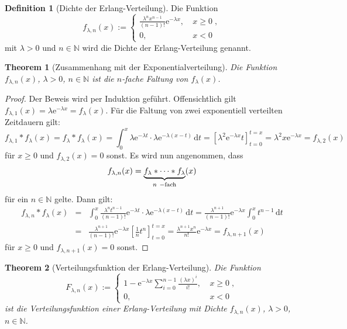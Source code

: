 \documentclass[a4paper,11pt,oneside]{article}
\newtheorem{theorem}{Theorem}
\theoremstyle{definition}
\newtheorem{definition}{Definition}
\begin{document}
\begin{definition}[Dichte der Erlang-Verteilung]
Die Funktion
$$
f_{\lambda,n}(x):=\left\{\begin{matrix}
\frac{\lambda^n x^{n-1}}{(n-1)!} \mathrm{e}^{-\lambda x},&~x\ge0\;,\\
0,&~x<0
\end{matrix}\right.
$$
mit $\lambda>0$ und $n\in\mathbb{N}$ wird die Dichte der Erlang-Verteilung genannt.
\end{definition}

\begin{theorem}[Zusammenhang mit der Exponentialverteilung]
Die Funktion $f_{\lambda,n}(x)$, $\lambda>0$, $n\in\mathbb{N}$ ist die $n$-fache Faltung von $f_\lambda(x)$.
\end{theorem}

\begin{proof}
Der Beweis wird per Induktion geführt. Offensichtlich gilt $f_{\lambda,1}(x)=\lambda \mathrm{e}^{-\lambda x}=f_\lambda(x)$. Für die Faltung von zwei exponentiell verteilten Zeitdauern gilt:
$$
f_{\lambda,1}*f_\lambda(x)=
f_\lambda*f_\lambda(x)=
\int_0^x \lambda \mathrm{e}^{-\lambda t}\cdot\lambda \mathrm{e}^{-\lambda(x-t)}\,\mbox{d}t=
\left[\lambda^2\mathrm{e}^{-\lambda x}t\right]_{t=0}^{t=x}=
\lambda^2x\mathrm{e}^{-\lambda x}=f_{\lambda,2}(x)
$$
für $x\ge0$ und $f_{\lambda,2}(x)=0$ sonst. Es wird nun angenommen, dass
$$
f_{\lambda,n}(x)=\underbrace{f_\lambda*\cdots*f_\lambda}_{n~{\rm-fach}}(x)
$$
für ein $n\in\mathbb{N}$ gelte.
Dann gilt:
\begin{eqnarray*}
f_{\lambda,n}*f_\lambda(x)&=&
\int_0^x \frac{\lambda^n t^{n-1}}{(n-1)!}\mathrm{e}^{-\lambda t}\cdot\lambda \mathrm{e}^{-\lambda(x-t)}\,\mbox{d}t=
\frac{\lambda^{n+1}}{(n-1)!}\mathrm{e}^{-\lambda x}\int_0^x t^{n-1}\,\mbox{d}t\\&=&
\frac{\lambda^{n+1}}{(n-1)!}\mathrm{e}^{-\lambda x}\left[\frac{1}{n}t^n\right]_{t=0}^{t=x}=
\frac{\lambda^{n+1}x^n}{n!}\mathrm{e}^{-\lambda x}=
f_{\lambda,n+1}(x)
\end{eqnarray*}
für $x\ge0$ und $f_{\lambda,n+1}(x)=0$ sonst.
\end{proof}

\begin{theorem}[Verteilungsfunktion der Erlang-Verteilung]
Die Funktion
$$
F_{\lambda,n}(x):=\left\{\begin{matrix}
1-\mathrm{e}^{-\lambda x}\sum_{i=0}^{n-1}\frac{(\lambda x)^i}{i!},&~x\ge0\;,\\
0,&~x<0
\end{matrix}\right.
$$
ist die Verteilungsfunktion einer Erlang-Verteilung mit Dichte $f_{\lambda,n}(x)$, $\lambda>0$, $n\in\mathbb{N}$.
\end{theorem}
\end{document}
